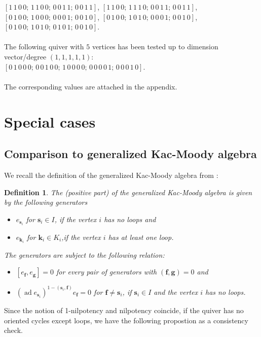 \documentclass{article}
\newcommand{\bs}{\mathbf{s}}
\newcommand{\bk}{\mathbf{k}}
\newcommand{\bbf}{\mathbf{f}}
\newcommand{\bg}{\mathbf{g}}
\DeclareMathOperator{\ad}{ad}
\newtheorem{definition}[theorem]{Definition}
\begin{document}
$[1\,1\,0\,0;\,1\,1\,0\,0;\,0\,0\,1\,1;\,0\,0\,1\,1]$, 
$[1\,1\,0\,0;\,1\,1\,1\,0;\,0\,0\,1\,1;\,0\,0\,1\,1]$, \\
$[0\,1\,0\,0;\,1\,0\,0\,0;\,0\,0\,0\,1;\,0\,0\,1\,0]$, 
$[0\,1\,0\,0;\,1\,0\,1\,0;\,0\,0\,0\,1;\,0\,0\,1\,0]$, \\
$[0\,1\,0\,0;\,1\,0\,1\,0;\,0\,1\,0\,1;\,0\,0\,1\,0]$.\\
 \\
The following quiver with $5$ vertices has been tested up to dimension vector/degree $(1,1,1,1,1)$:\\
$[0\,1\,0\,0\,0;\,0\,0\,1\,0\,0;\,1\,0\,0\,0\,0;\,0\,0\,0\,0\,1;\,0\,0\,0\,1\,0]$.\\
\\
The corresponding values are attached in the appendix.
 
\section{Special cases}
\subsection{Comparison to generalized Kac-Moody algebra}

We recall the definition of the generalized Kac-Moody algebra from \cite{pointsnilpotentvarities}:
 \begin{definition} \label{def gen KM from BSV}
     The (positive part) of the generalized Kac-Moody algebra is given by the following generators 
\begin{itemize}
      \item $e_{\bs_i}$ for $\bs_i \in I$, if the vertex $i$ has no loops and
     \item $e_{\bk_i}$ for $\bk_i \in K_i$,if the vertex $i$ has at least one loop.
     \end{itemize} 
     The generators are subject to the following relation:
\begin{itemize}
    \item $[e_{\bbf}, e_{\bg}] =0$ for every pair of generators with $(\bbf, \bg)=0$ and
    \item $(\ad e_{\bs_i})^{1-(\bs_i, \bbf)} e_{\bbf} = 0$ for $\bbf \neq \bs_i$, if $\bs_i \in I$ and the vertex $i$ has no loops.
\end{itemize}
 \end{definition}

Since the notion of 1-nilpotency and nilpotency coincide, if the quiver has no oriented cycles except loops, we have the following propostion as a consistency check.
\end{document}
